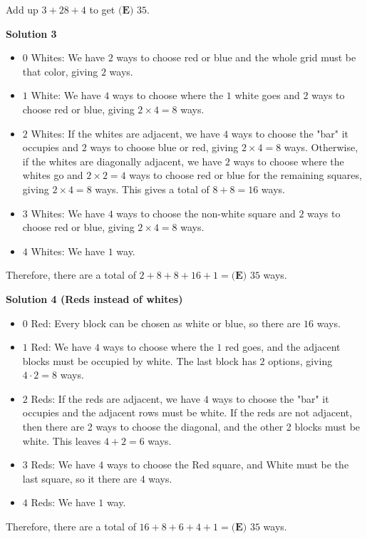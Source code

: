 \begin{enumerate}
 Add up $3+28+4$ to get $\boxed{\textbf{(E) } 35}$.

 



\textbf{Solution 3}


            \begin{itemize}
        \item $0$ Whites: We have $2$ ways to choose red or blue and the whole grid must be that color, giving $2$ ways.
        \item $1$ White: We have $4$ ways to choose where the $1$ white goes and $2$ ways to choose red or blue, giving $2 \times 4 = 8$ ways.
        \item $2$ Whites: If the whites are adjacent, we have $4$ ways to choose the "bar" it occupies and $2$ ways to choose blue or red, giving $2 \times 4 = 8$ ways. Otherwise, if the whites are diagonally adjacent, we have $2$ ways to choose where the whites go and $2 \times 2 = 4$ ways to choose red or blue for the remaining squares, giving $2 \times 4 = 8$ ways. This gives a total of $8 + 8 = 16$ ways.
        \item $3$ Whites: We have $4$ ways to choose the non-white square and $2$ ways to choose red or blue, giving $2 \times 4 = 8$ ways.
        \item $4$ Whites: We have $1$ way.
            \end{itemize}
            Therefore, there are a total of $2 + 8 + 8 + 16 + 1 = \boxed{\textbf{(E) } 35}$ ways.

 



\textbf{Solution 4 (Reds instead of whites)}


            \begin{itemize}
        \item $0$ Red: Every block can be chosen as white or blue, so there are $16$ ways.
        \item $1$ Red: We have $4$ ways to choose where the $1$ red goes, and the adjacent blocks must be occupied by white. The last block has $2$ options, giving $4\cdot 2 = 8$ ways.
        \item $2$ Reds: If the reds are adjacent, we have $4$ ways to choose the "bar" it occupies and the adjacent rows must be white. If the reds are not adjacent, then there are 2 ways to choose the diagonal, and the other 2 blocks must be white. This leaves $4+2=6$ ways.
        \item $3$ Reds: We have $4$ ways to choose the Red square, and White must be the last square, so it there are $4$ ways.
        \item $4$ Reds: We have $1$ way.
            \end{itemize}
            Therefore, there are a total of $16 + 8 + 6 + 4 + 1 = \boxed{\textbf{(E) } 35}$ ways. 


\end{enumerate}
